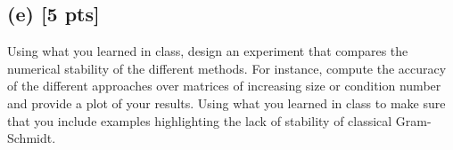 \documentclass[twoside,10pt]{article}
\begin{document}
\subsection*{(e) [5 pts]}
Using what you learned in class, design an experiment that compares the numerical stability of the different methods. 
For instance, compute the accuracy of the different approaches over matrices of increasing size or condition number and provide a plot of your results.
Using what you learned in class to make sure that you include examples highlighting the lack of stability of classical Gram-Schmidt.
\end{document}

